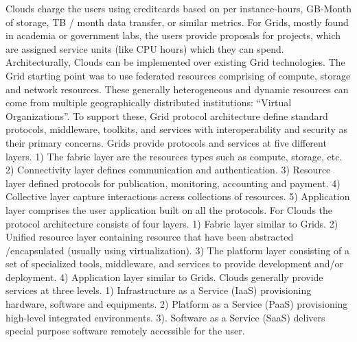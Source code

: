 \documentclass{article}
\begin{document}
Clouds charge the users using creditcards based on per
instance-hours, GB-Month of storage, TB / month data transfer, or similar
metrics. For Grids, mostly found in academia or government labs,  the users
provide proposals for projects, which are assigned service units (like CPU
hours) which they can spend. Architecturally, Clouds can be implemented over
existing Grid technologies. The Grid starting point was to use federated
resources comprising of compute, storage and network resources. These generally
heterogeneous and dynamic resources can come from multiple geographically
distributed institutions: ``Virtual Organizations''. To support these, Grid
protocol architecture define standard protocols, middleware, toolkits, and
services with interoperability and security as their primary concerns. Grids
provide protocols and services at five different layers. 1) The fabric layer are
the resources types such as compute, storage, etc. 2) Connectivity layer defines
communication and authentication. 3) Resource layer defined protocols for
publication, monitoring, accounting and payment. 4) Collective layer capture
interactions acress collections of resources. 5) Application layer comprises the
user application built on all the protocols. For Clouds the protocol
architecture consists of four layers. 1) Fabric layer similar to Grids. 2)
Unified resource layer containing resource that have been abstracted
/encapsulated (usually using virtualization). 3) The platform layer consisting
of a set of specialized tools, middleware, and services to provide development
and/or deployment. 4) Application layer similar to Grids. Clouds generally
provide services at three levels. 1) Infrastructure as a Service (IaaS)
provisioning hardware, software and equipments. 2) Platform as a Service (PaaS)
provisioning high-level integrated environments. 3). Software as a Service
(SaaS) delivers special purpose software remotely accessible for the user.
\end{document}
